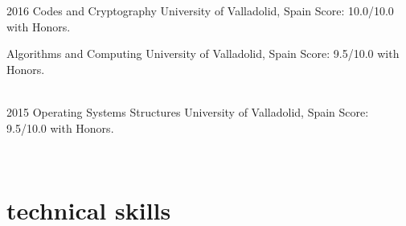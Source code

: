 \documentclass[]{friggeri-cv} %
\begin{document}
\begin{entrylist}


\entry
{2016}
{Codes and Cryptography}
{University of Valladolid, Spain}
{Score: 10.0/10.0 with Honors.}

\entry
{}
{Algorithms and Computing}
{University of Valladolid, Spain}
{Score: 9.5/10.0 with Honors.} 

\\
\entry
{2015}
{Operating Systems Structures}
{University of Valladolid, Spain}
{Score: 9.5/10.0 with Honors.}


\end{entrylist}
\\
\noindent\begin{minipage}[t]{0.5\linewidth}


\section{technical skills}
\hfill
\begin{comment}
\begin{description}[style=multiline,leftmargin=2.25cm]


\item[Languages]  Java, Python, C, JavaScript, HTML, Latex, MarkDown,  XML, JSON

\item[Frameworks]  Android

\item[OS]  Unix, Mac, Windows, Android, iOS

\item[Methodologies]  Scrum, Object Oriented Programming, Design Patterns, UML 

\item[Tools]  Sublime Text, Atom, Android Studio, Intellij IDEa, Eclipse, NetBeans, Trello, Github, Visual Paradigm


\end{description}
\end{comment}
\begin{flushright}


\end{flushright}
\end{minipage}
\end{document}
